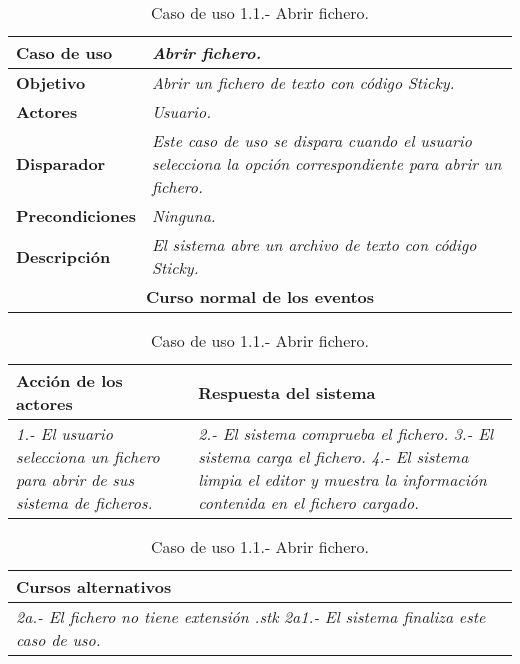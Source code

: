    \begin{table}[!ht] %
      \centering
      \begin{tabular}{|p{4cm}|p{11.5cm}|}
         \hline
         \textbf{Caso de uso} & \textit{Abrir fichero.}\\ \hline
         \textbf{Objetivo} & \textit{Abrir un fichero de texto con código Sticky.}\\ \hline
         \textbf{Actores} & \textit{Usuario.}\\ \hline
         \textbf{Disparador} & \textit{Este caso de uso se dispara cuando el usuario selecciona la opción correspondiente para abrir
                                 un fichero.}\\ \hline
         \textbf{Precondiciones} & \textit{Ninguna.}\\ \hline
         \textbf{Descripción} & \textit{El sistema abre un archivo de texto con código Sticky.}\\ \hline
         \multicolumn{2}{|c|}{\textbf{Curso normal de los eventos}}\\ \hline
    \end{tabular}
    \begin{tabular}{|p{7.75cm}|p{7.75cm}|}
      \hspace{2cm}\textbf{Acción de los actores} & \hspace{1.75cm}\textbf{Respuesta del sistema}\\ \hline
      \textit{1.- El usuario selecciona un fichero para abrir de sus sistema de ficheros.} & \textit{2.- El sistema comprueba el fichero.}
                                                                           \textit{3.- El sistema carga el fichero.}
                                                                           \textit{4.- El sistema limpia el editor y muestra la información
                                                                                       contenida en el fichero cargado.} \\ \hline
    \end{tabular}
    \begin{tabular}{|p{15.9cm}|}
      \hspace{6cm}\textbf{Cursos alternativos}\\ \hline
      \textit{2a.- El fichero no tiene extensión .stk}
         \textit{  2a1.- El sistema finaliza este caso de uso.} \\ \hline
    \end{tabular}
    \caption{Caso de uso 1.1.- Abrir fichero.}
   \end{table}



